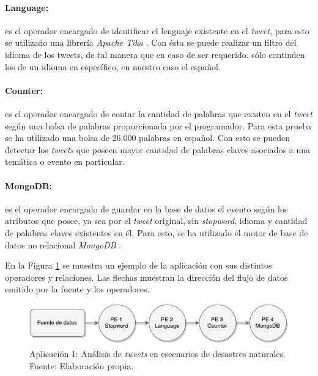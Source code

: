 \paragraph{Language:} es el operador encargado de identificar el lenguaje existente en el \textit{tweet}, para esto se utilizado una librería \textit{Apache Tika} \citep{mattmann2011tika}. Con ésta se puede realizar un filtro del idioma de los tweets, de tal manera que en caso de ser requerido, sólo continúen los de un idioma en específico, en nuestro caso el español.

\paragraph{Counter:} es el operador encargado de contar la cantidad de palabras que existen en el \textit{tweet} según una bolsa de palabras proporcionada por el programador. Para esta prueba se ha utilizado una bolsa de 26.000 palabras en español. Con esto se pueden detectar los \textit{tweets} que poseen mayor cantidad de palabras claves asociados a una temática o evento en particular.

\paragraph{MongoDB:} es el operador encargado de guardar en la base de datos el evento según los atributos que posee, ya sea por el \textit{tweet} original, sin \textit{stopword}, idioma y cantidad de palabras claves existentes en él. Para esto, se ha utilizado el motor de base de datos no relacional \textit{MongoDB} \citep{chodorow2013mongodb}.

En la Figura \ref{fig:primeraAplicacion} se muestra un ejemplo de la aplicación con sus distintos operadores y relaciones. Las flechas muestran la dirección del flujo de datos emitido por la fuente y los operadores.

\begin{figure}[!hb]
	\centering
	\captionsetup{justification=centering}
		\includegraphics[scale=0.6]{images/App1.pdf}
	\caption[Aplicación 1: Análisis de \textit{tweets} en escenarios de desastres naturales.]{Aplicación 1: Análisis de \textit{tweets} en escenarios de desastres naturales.\\Fuente: Elaboración propia.}
	\label{fig:primeraAplicacion}
\end{figure}

